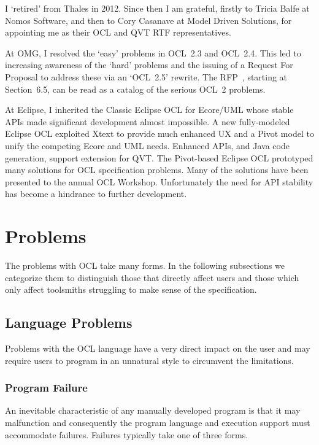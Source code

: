 \documentclass{jot}
\begin{document}
I `retired' from Thales in 2012. Since then I am grateful, firstly to Tricia Balfe at Nomos Software, and then to Cory Casanave at Model Driven Solutions, for appointing me as their OCL and QVT RTF representatives.

At OMG, I resolved the `easy' problems in OCL~2.3 and OCL~2.4. This led to increasing awareness of the `hard' problems and the issuing of a Request For Proposal to address these via an `OCL~2.5' rewrite. The RFP~\cite{OCL-2.5-RFP}, starting at Section~6.5, can be read as a catalog of the serious OCL~2 problems.

At Eclipse, I inherited the Classic Eclipse OCL for Ecore/UML whose stable APIs made significant development almost impossible. A new fully-modeled Eclipse OCL exploited Xtext to provide much enhanced UX and a Pivot model to unify the competing Ecore and UML needs. Enhanced APIs, and Java code generation, support extension for QVT. The Pivot-based Eclipse OCL prototyped many solutions for OCL specification problems. Many of the solutions have been presented to the annual OCL Workshop. Unfortunately the need for API stability has become a hindrance to further development.
\section{Problems}\label{Problems}

The problems with OCL take many forms. In the following subsections we categorize them to distinguish those that directly affect users and those which only affect toolsmiths struggling to make sense of the specification.  

\subsection{Language Problems}

Problems with the OCL language have a very direct impact on the user and may require users to program in an unnatural style to circumvent the limitations.  

\subsubsection{Program Failure}

An inevitable characteristic of any manually developed program is that it may malfunction and consequently the program language and execution support must accommodate failures. Failures typically take one of three forms.
\end{document}
